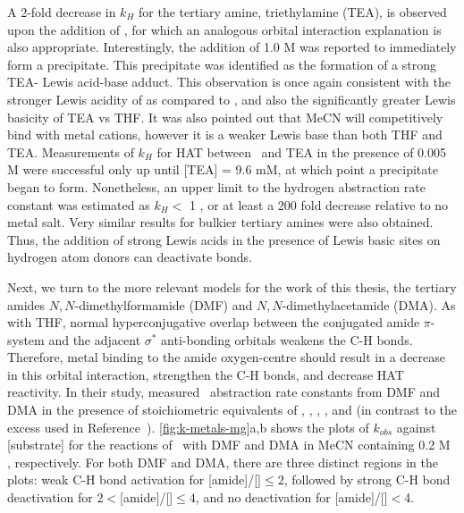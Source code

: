 \begin{doublespace}
A 2-fold decrease in $k_H$ for the tertiary amine, triethylamine (TEA), is
observed upon the addition of , for which an analogous orbital
interaction explanation is also appropriate. Interestingly, the addition of 1.0
M  was reported to immediately form a precipitate. This
precipitate was identified as the formation of a strong TEA- Lewis
acid-base adduct. This observation is once again consistent with the stronger
Lewis acidity of  as compared to , and also the
significantly greater Lewis basicity of TEA vs THF.\cite{Salamone2013a,
Reichardt2010} It was also pointed out that MeCN will competitively bind with
metal cations, however it is a weaker Lewis base than both THF and TEA.
Measurements of $k_H$ for HAT between \cumo\ and TEA in the presence of 0.005 M
 were successful only up until [TEA] = 9.6 mM, at which point a
precipitate began to form. Nonetheless, an upper limit to the hydrogen
abstraction rate constant was estimated as $k_H <$ 1 \Ms, or at least a 200
fold decrease relative to no metal salt. Very similar results for bulkier
tertiary amines were also obtained. Thus, the addition of strong Lewis acids in
the presence of Lewis basic sites on hydrogen atom donors can deactivate
 bonds.

Next, we turn to the more relevant models for the work of this thesis, the
tertiary amides $N,N$-dimethylformamide (DMF) and $N,N$-dimethylacetamide (DMA).
As with THF, normal hyperconjugative overlap between the conjugated amide
$\pi$-system and the adjacent  $\sigma^*$ anti-bonding orbitals weakens
the C-H bonds. Therefore, metal binding to the amide oxygen-centre should result
in a decrease in this orbital interaction, strengthen the C-H bonds, and
decrease HAT reactivity. In their study, \citet{Salamone2015metals} measured
\cumo\ abstraction rate constants from DMF and DMA in the presence of
stoichiometric equivalents of , , ,
, and  (in contrast to the excess used in
Reference~). \ref{fig:k-metals-mg}a,b shows the plots of
$k_{obs}$ against [substrate] for the reactions of \cumo\ with DMF and DMA in
MeCN containing 0.2 M , respectively. For both DMF and DMA, there
are three distinct regions in the plots: weak C-H bond activation for
[amide]/[]$\leq 2$, followed by strong C-H bond deactivation for
2$<$[amide]/[]$\leq$4, and no deactivation for
[amide]/[]$<$4.


\end{doublespace}
